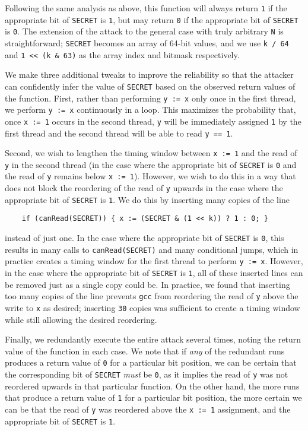 Following the same analysis as above, this function will always return \verb|1|
if the appropriate bit of \verb|SECRET| is \verb|1|, but may return \verb|0| if
the appropriate bit of \verb|SECRET| is \verb|0|.
The extension of the attack to the general case with truly arbitrary \verb|N|
is straightforward; \verb|SECRET| becomes an array of 64-bit values, and we use
\verb|k / 64| and \verb|1 << (k & 63)| as the array index and bitmask
respectively.

We make three additional tweaks to improve the reliability so that the attacker
can confidently infer the value of \verb|SECRET| based on the observed return
values of the function.
First, rather than performing \verb|y := x| only once in the first thread, we
perform \verb|y := x| continuously in a loop.
This maximizes the probability that, once \verb|x := 1| occurs in the second
thread, \verb|y| will be immediately assigned \verb|1| by the first thread
and the second thread will be able to read \verb|y == 1|.

Second, we wish to lengthen the timing window between \verb|x := 1| and the
read of \verb|y| in the second thread (in the case where the appropriate bit of
\verb|SECRET| is \verb|0| and the read of \verb|y| remains below
\verb|x := 1|).
However, we wish to do this in a way that does not block the reordering of the
read of \verb|y| upwards in the case where the appropriate bit of \verb|SECRET|
is \verb|1|.
We do this by inserting many copies of the line
\begin{verbatim}
    if (canRead(SECRET)) { x := (SECRET & (1 << k)) ? 1 : 0; }
\end{verbatim}
instead of just one.
In the case where the appropriate bit of \verb|SECRET| is \verb|0|, this
results in many calls to \verb|canRead(SECRET)| and many conditional jumps,
which in practice creates a timing window for the first thread to perform
\verb|y := x|.
However, in the case where the appropriate bit of \verb|SECRET| is \verb|1|,
all of these inserted lines can be removed just as a single copy could be.
In practice, we found that inserting too many copies of the line prevents
\verb|gcc| from reordering the read of \verb|y| above the write to \verb|x| as
desired; inserting \verb|30| copies was sufficient to create a timing window
while still allowing the desired reordering.

Finally, we redundantly execute the entire attack several times, noting the
return value of the function in each case.
We note that if \emph{any} of the redundant runs produces a return value of
\verb|0| for a particular bit position, we can be certain that the
corresponding bit of \verb|SECRET| \emph{must} be \verb|0|, as it implies the
read of \verb|y| was not reordered upwards in that particular function.
On the other hand, the more runs that produce a return value of \verb|1| for a
particular bit position, the more certain we can be that the read of \verb|y|
was reordered above the \verb|x := 1| assignment, and the appropriate bit of
\verb|SECRET| is \verb|1|.

